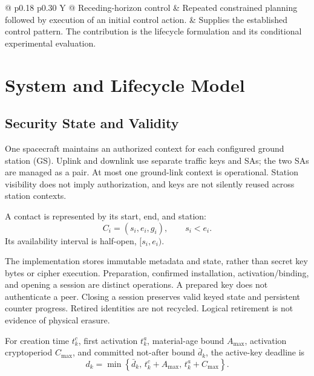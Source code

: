 \documentclass[conference]{IEEEtran}
\begin{document}
\begin{table}[!t]
\begin{tabularx}{\textwidth}{
        @{}
        p{}
        p{}
        Y
        @{}
    }
        Receding-horizon control \cite{rhc}
        &
        Repeated constrained planning followed by execution
        of an initial control action.
        &
        Supplies the established control pattern.
        The contribution is the lifecycle formulation and its
        conditional experimental evaluation.
        \\

        \bottomrule
    \end{tabularx}
\end{table}

\FloatBarrier


\section{System and Lifecycle Model}
\label{sec:model}

\subsection{Security State and Validity}

One spacecraft maintains an authorized context for each
configured ground station (GS).
Uplink and downlink use separate traffic keys and SAs;
the two SAs are managed as a pair.
At most one ground-link context is operational.
Station visibility does not imply authorization, and keys
are not silently reused across station contexts.

A contact is represented by its start, end, and station:
\[
    C_i=(s_i,e_i,g_i),
    \qquad s_i<e_i.
\]
Its availability interval is half-open, $[s_i,e_i)$.

The implementation stores immutable metadata and state,
rather than secret key bytes or cipher execution.
Preparation, confirmed installation, activation/binding,
and opening a session are distinct operations.
A prepared key does not authenticate a peer.
Closing a session preserves valid keyed state and persistent
counter progress.
Retired identities are not recycled.
Logical retirement is not evidence of physical erasure.

For creation time $t_k^c$, first activation $t_k^a$,
material-age bound $A_{\max}$, activation cryptoperiod
$C_{\max}$, and committed not-after bound $\bar d_k$,
the active-key deadline is
\begin{equation}
    d_k=
    \min\left\{
        \bar d_k,\,
        t_k^c+A_{\max},\,
        t_k^a+C_{\max}
    \right\}.
    \label{eq:deadline}
\end{equation}
\end{document}
